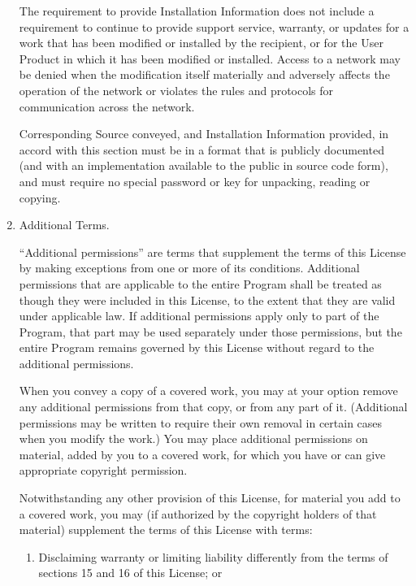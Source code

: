 \documentclass{article}
\begin{document}
\begin{enumerate}
    The requirement to provide Installation Information does not include a
    requirement to continue to provide support service, warranty, or updates
    for a work that has been modified or installed by the recipient, or for
    the User Product in which it has been modified or installed.  Access to a
    network may be denied when the modification itself materially and
    adversely affects the operation of the network or violates the rules and
    protocols for communication across the network.
    
    Corresponding Source conveyed, and Installation Information provided,
    in accord with this section must be in a format that is publicly
    documented (and with an implementation available to the public in
    source code form), and must require no special password or key for
    unpacking, reading or copying.
    
    \item Additional Terms.
    
    ``Additional permissions'' are terms that supplement the terms of this
    License by making exceptions from one or more of its conditions.
    Additional permissions that are applicable to the entire Program shall
    be treated as though they were included in this License, to the extent
    that they are valid under applicable law.  If additional permissions
    apply only to part of the Program, that part may be used separately
    under those permissions, but the entire Program remains governed by
    this License without regard to the additional permissions.
    
    When you convey a copy of a covered work, you may at your option
    remove any additional permissions from that copy, or from any part of
    it.  (Additional permissions may be written to require their own
    removal in certain cases when you modify the work.)  You may place
    additional permissions on material, added by you to a covered work,
    for which you have or can give appropriate copyright permission.
    
    Notwithstanding any other provision of this License, for material you
    add to a covered work, you may (if authorized by the copyright holders of
    that material) supplement the terms of this License with terms:
      \begin{enumerate}
      \item Disclaiming warranty or limiting liability differently from the
      terms of sections 15 and 16 of this License; or
    

\end{enumerate}
\end{enumerate}
\end{document}

